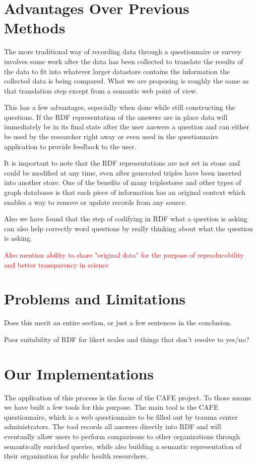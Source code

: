 \documentclass{amia}
\begin{document}
\section*{Advantages Over Previous Methods}
The more traditional way of recording data through a questionnaire or survey involves some work after the data has been collected to translate the results of the data to fit into whatever larger datastore contains the information the collected data is being compared.  What we are proposing is roughly the same as that translation step except from a semantic web point of view.

This has a few advantages, especially when done while still constructing the questions.  If the RDF representation of the answers are in place data will immediately be in its final state after the user answers a question and can either be used by the researcher right away or even used in the questionnaire application to provide feedback to the user.

It is important to note that the RDF representations are not set in stone and could be modified at any time, even after generated triples have been inserted into another store.  One of the benefits of many triplestores and other types of graph databases is that each piece of information has an original context which enables a way to remove or update records from any source.

Also we have found that the step of codifying in RDF what a question is asking can also help correctly word questions by really thinking about what the question is asking.

\textcolor{red}{Also mention ability to share "original data" for the purpose of reproducability and better transparency in science}

\section*{Problems and Limitations}
Does this merit an entire section, or just a few sentences in the conclusion.

Poor suitability of RDF for likert scales and things that don't resolve to yes/no?

\section*{Our Implementations}
The application of this process is the focus of the CAFE project.  To those means we have built a few tools for this purpose.  The main tool is the CAFE questionnaire, which is a web questionnaire to be filled out by trauma center administrators.  The tool records all answers directly into RDF and will eventually allow users to perform comparisons to other organizations through semantically enriched queries, while also building a semantic representation of their organization for public health researchers.
\end{document}
